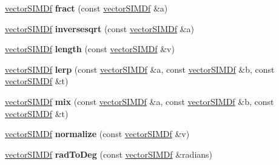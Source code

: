 \begin{DoxyCompactItemize}
\item 
\hyperlink{classirr_1_1core_1_1vectorSIMDf}{vector\+S\+I\+M\+Df} {\bfseries fract} (const \hyperlink{classirr_1_1core_1_1vectorSIMDf}{vector\+S\+I\+M\+Df} \&a)\hypertarget{namespaceirr_1_1core_a503265bed70a1842ccb5b7de811f6ef3}{}\label{namespaceirr_1_1core_a503265bed70a1842ccb5b7de811f6ef3}

\item 
\hyperlink{classirr_1_1core_1_1vectorSIMDf}{vector\+S\+I\+M\+Df} {\bfseries inversesqrt} (const \hyperlink{classirr_1_1core_1_1vectorSIMDf}{vector\+S\+I\+M\+Df} \&a)\hypertarget{namespaceirr_1_1core_a44261346635f7eae9401343dd98ea3db}{}\label{namespaceirr_1_1core_a44261346635f7eae9401343dd98ea3db}

\item 
\hyperlink{classirr_1_1core_1_1vectorSIMDf}{vector\+S\+I\+M\+Df} {\bfseries length} (const \hyperlink{classirr_1_1core_1_1vectorSIMDf}{vector\+S\+I\+M\+Df} \&v)\hypertarget{namespaceirr_1_1core_aded8b9fa3abd1aa9137100bf3093dff0}{}\label{namespaceirr_1_1core_aded8b9fa3abd1aa9137100bf3093dff0}

\item 
\hyperlink{classirr_1_1core_1_1vectorSIMDf}{vector\+S\+I\+M\+Df} {\bfseries lerp} (const \hyperlink{classirr_1_1core_1_1vectorSIMDf}{vector\+S\+I\+M\+Df} \&a, const \hyperlink{classirr_1_1core_1_1vectorSIMDf}{vector\+S\+I\+M\+Df} \&b, const \hyperlink{classirr_1_1core_1_1vectorSIMDf}{vector\+S\+I\+M\+Df} \&t)\hypertarget{namespaceirr_1_1core_af7990ccb1823093ca2475b8e431dbe66}{}\label{namespaceirr_1_1core_af7990ccb1823093ca2475b8e431dbe66}

\item 
\hyperlink{classirr_1_1core_1_1vectorSIMDf}{vector\+S\+I\+M\+Df} {\bfseries mix} (const \hyperlink{classirr_1_1core_1_1vectorSIMDf}{vector\+S\+I\+M\+Df} \&a, const \hyperlink{classirr_1_1core_1_1vectorSIMDf}{vector\+S\+I\+M\+Df} \&b, const \hyperlink{classirr_1_1core_1_1vectorSIMDf}{vector\+S\+I\+M\+Df} \&t)\hypertarget{namespaceirr_1_1core_a3267276e1af481496e2be405722dee8e}{}\label{namespaceirr_1_1core_a3267276e1af481496e2be405722dee8e}

\item 
\hyperlink{classirr_1_1core_1_1vectorSIMDf}{vector\+S\+I\+M\+Df} {\bfseries normalize} (const \hyperlink{classirr_1_1core_1_1vectorSIMDf}{vector\+S\+I\+M\+Df} \&v)\hypertarget{namespaceirr_1_1core_a6e1c43b1b7874ab6d17c9dcde3fe8ebf}{}\label{namespaceirr_1_1core_a6e1c43b1b7874ab6d17c9dcde3fe8ebf}

\item 
\hyperlink{classirr_1_1core_1_1vectorSIMDf}{vector\+S\+I\+M\+Df} {\bfseries rad\+To\+Deg} (const \hyperlink{classirr_1_1core_1_1vectorSIMDf}{vector\+S\+I\+M\+Df} \&radians)\hypertarget{namespaceirr_1_1core_a4d9ebc17249bf6a00973e78c9fce618e}{}\label{namespaceirr_1_1core_a4d9ebc17249bf6a00973e78c9fce618e}


\end{DoxyCompactItemize}
